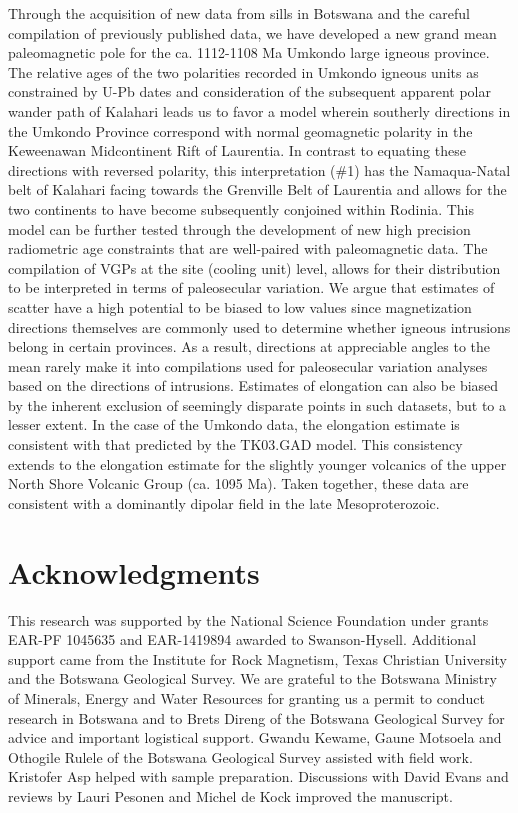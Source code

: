 \documentclass[11pt,letterpaper]{article}
\begin{document}
Through the acquisition of new data from sills in Botswana and the careful compilation of previously published data, we have developed a new grand mean paleomagnetic pole for the ca. 1112-1108 Ma Umkondo large igneous province. The relative ages of the two polarities recorded in Umkondo igneous units as constrained by U-Pb dates and consideration of the subsequent apparent polar wander path of Kalahari leads us to favor a model wherein southerly directions in the Umkondo Province correspond with normal geomagnetic polarity in the Keweenawan Midcontinent Rift of Laurentia. In contrast to equating these directions with reversed polarity, this interpretation ($\#$1) has the Namaqua-Natal belt of Kalahari facing towards the Grenville Belt of Laurentia and allows for the two continents to have become subsequently conjoined within Rodinia. This model can be further tested through the development of new high precision radiometric age constraints that are well-paired with paleomagnetic data. The compilation of VGPs at the site (cooling unit) level, allows for their distribution to be interpreted in terms of paleosecular variation. We argue that estimates of scatter have a high potential to be biased to low values since magnetization directions themselves are commonly used to determine whether igneous intrusions belong in certain provinces. As a result, directions at appreciable angles to the mean rarely make it into compilations used for paleosecular variation analyses based on the directions of intrusions. Estimates of elongation can also be biased by the inherent exclusion of seemingly disparate points in such datasets, but to a lesser extent. In the case of the Umkondo data, the elongation estimate is consistent with that predicted by the TK03.GAD model. This consistency extends to the elongation estimate for the slightly younger volcanics of the upper North Shore Volcanic Group (ca. 1095 Ma). Taken together, these data are consistent with a dominantly dipolar field in the late Mesoproterozoic. 

\section*{Acknowledgments}
This research was supported by the National Science Foundation under grants EAR-PF 1045635 and EAR-1419894 awarded to Swanson-Hysell. Additional support came from the Institute for Rock Magnetism, Texas Christian University and the Botswana Geological Survey. We are grateful to the Botswana Ministry of Minerals, Energy and Water Resources for granting us a permit to conduct research in Botswana and to Brets Direng of the Botswana Geological Survey for advice and important logistical support. Gwandu Kewame, Gaune Motsoela and Othogile Rulele of the Botswana Geological Survey assisted with field work. Kristofer Asp helped with sample preparation. Discussions with David Evans and reviews by Lauri Pesonen and Michel de Kock improved the manuscript. 
\end{document}
